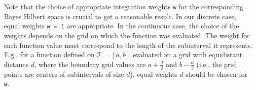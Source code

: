 \documentclass{article}
\begin{document}
Note that the choice of appropriate integration weights \texttt{w} for the corresponding Bayes Hilbert space is crucial to get a reasonable result.
In our discrete case, equal weights \texttt{w = 1} are appropriate.
In the continuous case, the choice of the weights depends on the grid on which the function was evaluated.
The weight for each function value must correspond to the length of the subinterval it represents.
E.g., for a function defined on $\mathcal{T} = [a, b]$ evaluated on a grid with equidistant distance $d$, where the boundary grid values are $a + \frac{d}{2}$ and $b - \frac{d}{2}$ (i.e., the grid points are centers of subintervals of size $d$), equal weights $d$ should be chosen for \texttt{w}.
\end{document}
